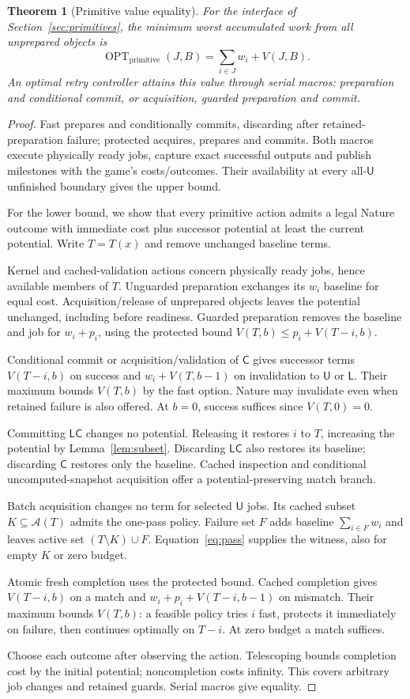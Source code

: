 \documentclass[acmsmall,screen,review,anonymous]{acmart}
\newtheorem{theorem}{Theorem}
\newcommand{\U}{\mathsf U}
\newcommand{\C}{\mathsf C}
\newcommand{\LL}{\mathsf L}
\newcommand{\LC}{\mathsf{LC}}
\begin{document}
\begin{theorem}[Primitive value equality]
\label{thm:primitive}
For the interface of Section~\ref{sec:primitives}, the minimum worst accumulated work from all unprepared objects is
\[
\operatorname{OPT}_{\mathrm{primitive}}(J,B)=\sum_{i\in J}w_i+V(J,B).
\]
An optimal retry controller attains this value through serial macros: preparation and conditional commit, or acquisition, guarded preparation and commit.
\end{theorem}
\begin{proof}
Fast prepares and conditionally commits, discarding after retained-preparation failure; protected acquires, prepares and commits. Both macros execute physically ready jobs, capture exact successful outputs and publish milestones with the game's costs/outcomes. Their availability at every all-$\U$ unfinished boundary gives the upper bound.

For the lower bound, we show that every primitive action admits a legal Nature outcome with immediate cost plus successor potential at least the current potential. Write $T=T(x)$ and remove unchanged baseline terms.

Kernel and cached-validation actions concern physically ready jobs, hence available members of $T$. Unguarded preparation exchanges its $w_i$ baseline for equal cost. Acquisition/release of unprepared objects leaves the potential unchanged, including before readiness. Guarded preparation removes the baseline and job for $w_i+p_i$, using the protected bound $V(T,b)\le p_i+V(T-i,b)$.

Conditional commit or acquisition/validation of $\C$ gives successor terms $V(T-i,b)$ on success and $w_i+V(T,b-1)$ on invalidation to $\U$ or $\LL$. Their maximum bounds $V(T,b)$ by the fast option. Nature may invalidate even when retained failure is also offered. At $b=0$, success suffices since $V(T,0)=0$.

Committing $\LC$ changes no potential. Releasing it restores $i$ to $T$, increasing the potential by Lemma~\ref{lem:subset}. Discarding $\LC$ also restores its baseline; discarding $\C$ restores only the baseline. Cached inspection and conditional uncomputed-snapshot acquisition offer a potential-preserving match branch.

Batch acquisition changes no term for selected $\U$ jobs. Its cached subset $K\subseteq\mathcal A(T)$ admits the one-pass policy. Failure set $F$ adds baseline $\sum_{i\in F}w_i$ and leaves active set $(T\setminus K)\cup F$. Equation~\eqref{eq:pass} supplies the witness, also for empty $K$ or zero budget.

Atomic fresh completion uses the protected bound. Cached completion gives $V(T-i,b)$ on a match and $w_i+p_i+V(T-i,b-1)$ on mismatch. Their maximum bounds $V(T,b)$: a feasible policy tries $i$ fast, protects it immediately on failure, then continues optimally on $T-i$. At zero budget a match suffices.

Choose each outcome after observing the action. Telescoping bounds completion cost by the initial potential; noncompletion costs infinity. This covers arbitrary job changes and retained guards. Serial macros give equality.
\end{proof}
\end{document}
